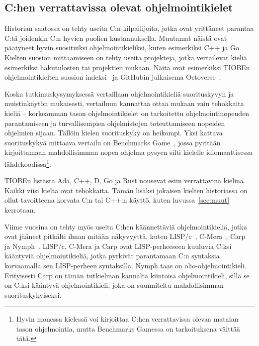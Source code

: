 \subsection{C:hen verrattavissa olevat ohjelmointikielet}

Historian saatossa on tehty useita C:n kilpailijoita, jotka ovat yrittäneet
parantaa C:tä joidenkin C:n hyvien puolien kustannuksella. Muutamat näistä ovat
päätyneet hyvin suosituiksi ohjelmointikieliksi, kuten esimerkiksi C++ ja Go.
Kielten suosion mittaamiseen on tehty useita projekteja, jotka vertailevat
kieliä esimerkiksi hakutulosten tai projektien mukaan. Näitä ovat esimerkiksi
TIOBEn ohjelmointikielten suosion indeksi~\citep{tiobe} ja GitHubin julkaisema
Octoverse~\citep{octoverse}.

Koska tutkimuskysymyksessä vertaillaan ohjelmointikieliä suorituskyvyn ja
muistinkäytön mukaisesti, vertailuun kannattaa ottaa mukaan vain tehokkaita
kieliä -- korkeamman tason ohjelmointikielet on tarkoitettu ohjelmointinopeuden
parantamiseen ja turvallisempien ohjelmistojen toteuttamiseen nopeiden
ohjelmien sijaan. Tällöin kielen suorituskyky on heikompi. Yksi kattava
suorituskykyä mittaava vertailu on Benchmarks Game~\citep{benchmarks}, jossa
pyritään kirjoittamaan mahdollisimman nopea ohjelma pysyen silti kielelle
idiomaattisessa lähdekoodissa\footnote{Hyvin monessa kielessä voi kirjoittaa
C:hen verrattavissa olevaa matalan tason ohjelmointia, mutta Benchmarks Gamessa
on tarkoituksena välttää tätä.}.

TIOBEn listasta Ada, C++, D, Go ja Rust nousevat esiin verrattavina kielinä.
Kaikki viisi kieltä ovat tehokkaita. Tämän lisäksi jokaisen kielten historiassa
on ollut tavoitteena korvata C:n tai C++:n käyttö, kuten luvussa~\ref{sec:muut}
kerrotaan.

Viime vuosina on tehty myös useita C:hen käännettäviä ohjelmointikieliä, jotka
ovat jääneet pitkälti ilman mitään näkyvyyttä, kuten LISP/c~\citep{clisp1},
C-Mera~\citep{clisp2}, Carp~\citep{clisp3} ja Nymph~\citep{nymph}. LISP/c,
C-Mera ja Carp ovat LISP-perheeseen kuuluvia C:ksi kääntyviä ohjelmointikieliä,
jotka pyrkivät parantamaan C:n syntaksia korvaamalla sen LISP-perheen
syntaksilla. Nymph taas on olio-ohjelmointikieli. Erityisesti Carp on tämän
tutkielman kannalta kiintoisa ohjelmointikieli, sillä se on C:ksi kääntyvä
ohjelmointikieli, joka on suunniteltu mahdollisimman suorituskykyiseksi.

